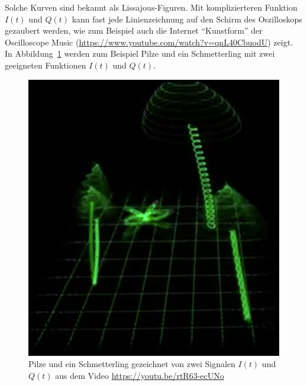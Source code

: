 Solche Kurven sind bekannt als Lissajous-Figuren.
Mit komplizierteren Funktion $I(t)$ und $Q(t)$ kann fast jede
Linienzeichnung auf den Schirm des Oszilloskops gezaubert werden,
wie zum Beispiel auch die Internet ``Kunstform'' der Oscilloscope
Music (\url{https://www.youtube.com/watch?v=qnL40CbuodU}) zeigt.
In Abbildung~\ref{figure:qam:pilze} werden zum Beispiel Pilze und
ein Schmetterling mit zwei geeigneten Funktionen $I(t)$ und $Q(t)$.

\begin{figure}
\centering
\includegraphics[width=0.5\hsize]{applications/qam/pilze.png}
\caption{Pilze und ein Schmetterling gezeichnet von zwei Signalen
$I(t)$ und $Q(t)$ aus dem Video \url{https://youtu.be/rtR63-ecUNo}
\label{figure:qam:pilze}}
\end{figure}



